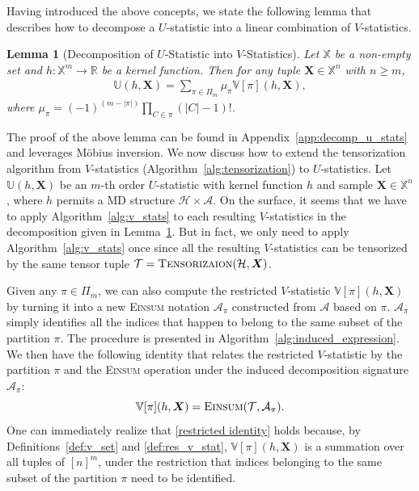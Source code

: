 \documentclass[12pt]{article}
\theoremstyle{plain}
\newtheorem{lemma}{Lemma}
\theoremstyle{definition}
\def\Einsum{\textsc{Einsum}}
\newcommand{\mobius}{M\"obius}
\newcommand{\sPi}{\pi}
\newcommand{\ustat}{\mathbb{U}}
\newcommand{\vstat}{\mathbb{V}}
\newcommand{\ustatp}[2]{\ustat(#1,#2)}
\newcommand{\samplespace}{\bbX}
\newcommand{\partition}{\Pi}
\newcommand{\partitionp}[1]{\partition_{#1}}
\newcommand{\tensorcontraction}{\textsc{Einsum}}
\newcommand{\bbR}{{\mathbb{R}}}
\def\bbX{\mathbb{X}}
\def\calA{\mathcal{A}}
\def\calT{\mathcal{T}}
\def\calH{\mathcal{H}}
\begin{document}
\begin{bibunit}[agsm]
Having introduced the above concepts, we state the following lemma that describes how to decompose a $U$-statistic into a linear combination of $V$-statistics.

\begin{lemma}[Decomposition of $U$-Statistic into $V$-Statistics]
\label{lem:decomp_u_to_v}
Let $\bbX$ be a non-empty set and $h: \bbX^{m} \rightarrow \bbR$ be a kernel function. Then for any tuple $\bm{X} \in \bbX^{n}$ with $n \geq m$,
\begin{align*}
    \ustat(h,\bm{X}) = \sum_{\sPi \in \partitionp{m}} 
    \mu_\sPi \vstat[\sPi](h, \bm{X}), 
\end{align*}
where $\mu_\sPi = (-1)^{(m-|\sPi|)} \prod_{C \in \sPi} (|C| - 1)!$.
\end{lemma}

The proof of the above lemma can be found in Appendix~\ref{app:decomp_u_stats} and leverages \mobius{} inversion. We now discuss how to extend the tensorization algorithm from $V$-statistics (Algorithm~\ref{alg:tensorization}) to $U$-statistics. Let $\ustatp{h}{\bm{X}}$ be an $m$-th order $U$-statistic with kernel function $h$ and sample $\bm{X} \in \samplespace^n$, where $h$ permits a MD structure $\calH \times \calA$. On the surface, it seems that we have to apply Algorithm~\ref{alg:v_stats} to each resulting $V$-statistics in the decomposition given in Lemma~\ref{lem:decomp_u_to_v}. But in fact, we only need to apply Algorithm~\ref{alg:v_stats} once since all the resulting $V$-statistics can be tensorized by the same tensor tuple $\calT = \textsc{Tensorizaion} (\calH, \bm{X})$. 

Given any $\pi \in \partitionp{m}$, we can also compute the restricted $V$-statistic $\vstat[\pi] (h, \bm{X})$ by turning it into a new \Einsum{} notation $\calA_{\pi}$ constructed from $\calA$ based on $\pi$. $\calA_{\pi}$ simply identifies all the indices that happen to belong to the same subset of the partition $\pi$. The procedure is presented in Algorithm~\ref{alg:induced_expression}. We then have the following identity that relates the restricted $V$-statistic by the partition $\sPi$ and the \Einsum{} operation under the induced decomposition signature $\calA_{\pi}$:
\begin{equation}
\label{restricted identity}
\vstat[\sPi](h, \bm{X}) =  \tensorcontraction(\calT, \calA_\sPi).
\end{equation}
One can immediately realize that \eqref{restricted identity} holds because, by Definitions~\ref{def:v_set} and \ref{def:res_v_stat}, $\vstat[\pi](h, \bm{X})$ is a summation over all tuples of $[n]^m$, under the restriction that indices belonging to the same subset of the partition $\pi$ need to be identified.


\end{bibunit}
\end{document}
